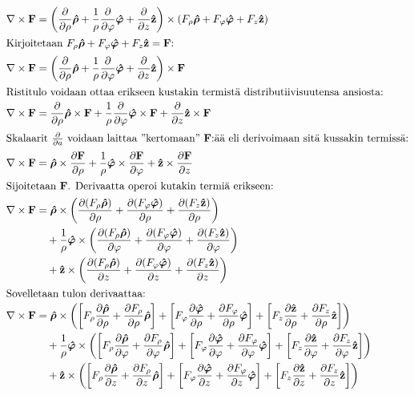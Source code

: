 \documentclass[../johdoksia.tex]{subfiles}
\begin{document}
\begin{enumerate}
		\begin{align}
			\curlop\vtr{F} &= \left(\pdv{}{\rho}\unitg{\rho} + \frac{1}{\rho}\pdv{}{\varphi}\unitg{\varphi} + \pdv{}{z}\unitv{z}\right)\times(F_\rho\unitg{\rho} + F_\varphi\unitg{\varphi} + F_z\unitv{z}) \\
			\intertext{Kirjoitetaan $F_\rho\unitg{\rho} + F_\varphi\unitg{\varphi} + F_z\unitv{z} = \vtr{F}$:}
			\curlop\vtr{F} &= \left(\pdv{}{\rho}\unitg{\rho} + \frac{1}{\rho}\pdv{}{\varphi}\unitg{\varphi} + \pdv{}{z}\unitv{z}\right)\times\vtr{F} \\
			\intertext{Ristitulo voidaan ottaa erikseen kustakin termistä distributiivisuutensa ansiosta:}
			\curlop\vtr{F} &= \pdv{}{\rho}\unitg{\rho}\times\vtr{F} + \frac{1}{\rho}\pdv{}{\varphi}\unitg{\varphi}\times\vtr{F} + \pdv{}{z}\unitv{z}\times\vtr{F} \\
			\intertext{Skalaarit $\pdv{}{a}$ voidaan laittaa ''kertomaan'' $\vtr{F}$:ää eli derivoimaan sitä kussakin termissä:}
			\curlop\vtr{F} &= \unitg{\rho}\times\pdv{\vtr{F}}{\rho} + \frac{1}{\rho}\unitg{\varphi}\times\pdv{\vtr{F}}{\varphi} + \unitv{z}\times\pdv{\vtr{F}}{z} \\
			\intertext{Sijoitetaan $\vtr{F}$. Derivaatta operoi kutakin termiä erikseen:}
			\curlop\vtr{F} &= \unitg{\rho}\times\left(\pdv{(F_\rho\unitg{\rho})}{\rho} + \pdv{(F_\varphi\unitg{\varphi})}{\rho} + \pdv{(F_z\unitv{z})}{\rho}\right) \\
			&\quad + \frac{1}{\rho}\unitg{\varphi}\times\left(\pdv{(F_\rho\unitg{\rho})}{\varphi} + \pdv{(F_\varphi\unitg{\varphi})}{\varphi} + \pdv{(F_z\unitv{z})}{\varphi}\right) \\
			&\quad + \unitv{z}\times\left(\pdv{(F_\rho\unitg{\rho})}{z} + \pdv{(F_\varphi\unitg{\varphi})}{z} + \pdv{(F_z\unitv{z})}{z}\right) \\
			\intertext{Sovelletaan tulon derivaattaa:}
			\curlop\vtr{F} &= \unitg{\rho}\times\left(\left[F_\rho\pdv{\unitg{\rho}}{\rho} + \pdv{F_\rho}{\rho}\unitg{\rho}\right] + \left[F_\varphi\pdv{\unitg{\varphi}}{\rho} + \pdv{F_\varphi}{\rho}\unitg{\varphi}\right] + \left[F_z\pdv{\unitv{z}}{\rho} + \pdv{F_z}{\rho}\unitv{z}\right]\right) \\
			&\quad + \frac{1}{\rho}\unitg{\varphi}\times\left(\left[F_\rho\pdv{\unitg{\rho}}{\varphi} + \pdv{F_\rho}{\varphi}\unitg{\rho}\right] + \left[F_\varphi\pdv{\unitg{\varphi}}{\varphi} + \pdv{F_\varphi}{\varphi}\unitg{\varphi}\right] + \left[F_z\pdv{\unitv{z}}{\varphi} + \pdv{F_z}{\varphi}\unitv{z}\right]\right) \\
			&\quad + \unitv{z}\times\left(\left[F_\rho\pdv{\unitg{\rho}}{z} + \pdv{F_\rho}{z}\unitg{\rho}\right] + \left[F_\varphi\pdv{\unitg{\varphi}}{z} + \pdv{F_\varphi}{z}\unitg{\varphi}\right] + \left[F_z\pdv{\unitv{z}}{z} + \pdv{F_z}{z}\unitv{z}\right]\right) \\

\end{align}
\end{enumerate}
\end{document}
